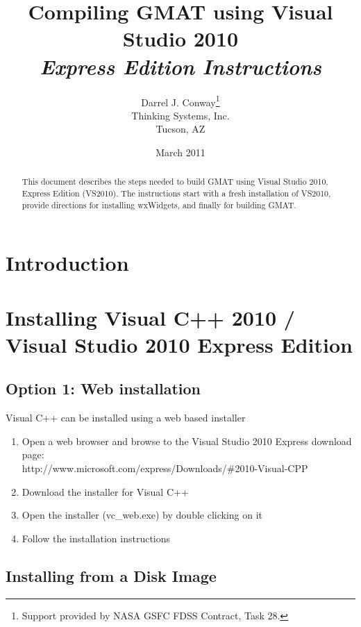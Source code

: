 \documentclass[letterpaper,10pt]{article}%
\begin{document}
\title{Compiling GMAT using Visual Studio 2010\\\textit{Express Edition Instructions}}
\author{Darrel J. Conway\thanks{Support provided by NASA GSFC FDSS Contract, Task 28.}
\\Thinking Systems, Inc.\\Tucson, AZ}
\date{March 2011}
\maketitle

\begin{abstract}
This document describes the steps needed to build GMAT using Visual Studio 2010, Express Edition (VS2010).  The instructions start with a fresh installation of VS2010, provide directions for installing wxWidgets, and finally for building GMAT. 
\end{abstract}

\section{Introduction}

\section{Installing Visual C++ 2010 / Visual Studio 2010 Express Edition}

\subsection{Option 1: Web installation}

Visual C++ can be installed using a web based installer

\begin{enumerate}
	\item Open a web browser and browse to the Visual Studio 2010 Express download page: \\http://www.microsoft.com/express/Downloads/\#2010-Visual-CPP
	\item Download the installer for Visual C++
	\item Open the installer (vc\_web.exe) by double clicking on it
	\item Follow the installation instructions
\end{enumerate}

\subsection{Installing from a Disk Image}
\end{document}
